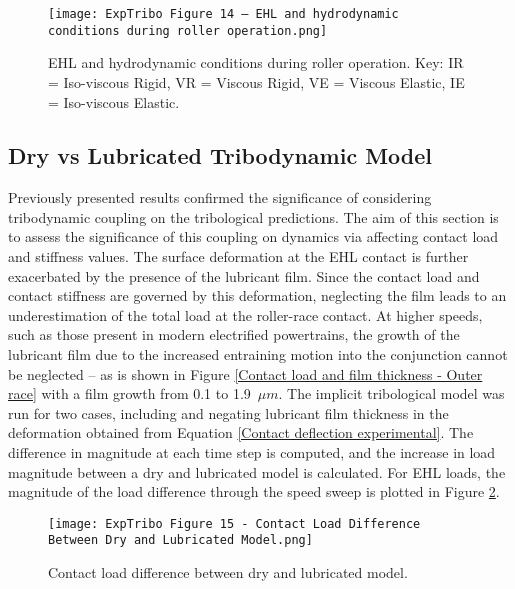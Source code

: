 \begin{figure}
	\centering
	\texttt{[image: ExpTribo Figure 14 – EHL and hydrodynamic conditions during roller operation.png]}
	\caption{EHL and hydrodynamic conditions during roller operation. Key: IR = Iso-viscous Rigid, VR = Viscous Rigid, VE = Viscous Elastic, IE = Iso-viscous Elastic.}
	\label{EHL and hydrodynamic conditions during roller operation}
\end{figure} 

\subsection{Dry vs Lubricated Tribodynamic Model}

Previously presented results confirmed the significance of considering tribodynamic coupling on the tribological predictions. The aim of this section is to assess the significance of this coupling on dynamics via affecting contact load and stiffness values. The surface deformation at the EHL contact is further exacerbated by the presence of the lubricant film. Since the contact load and contact stiffness are governed by this deformation, neglecting the film leads to an underestimation of the total load at the roller-race contact. At higher speeds, such as those present in modern electrified powertrains, the growth of the lubricant film due to the increased entraining motion into the conjunction cannot be neglected – as is shown in Figure \ref{Contact load and film thickness - Outer race} with a film growth from 0.1 to 1.9~$\mu m$. The implicit tribological model was run for two cases, including and negating lubricant film thickness in the deformation obtained from Equation \ref{Contact deflection experimental}. The difference in magnitude at each time step is computed, and the increase in load magnitude between a dry and lubricated model is calculated. For EHL loads, the magnitude of the load difference through the speed sweep is plotted in Figure \ref{Contact load difference between dry and lubricated model}.

\begin{figure}
	\centering
	\texttt{[image: ExpTribo Figure 15 - Contact Load Difference Between Dry and Lubricated Model.png]}
	\caption{Contact load difference between dry and lubricated model.}
	\label{Contact load difference between dry and lubricated model}
\end{figure} 


